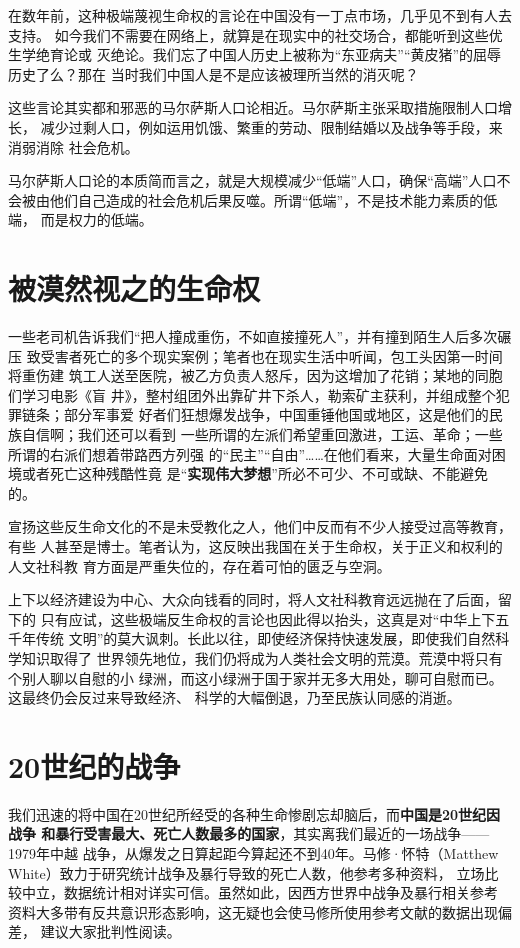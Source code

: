 在数年前，这种极端蔑视生命权的言论在中国没有一丁点市场，几乎见不到有人去支持。
如今我们不需要在网络上，就算是在现实中的社交场合，都能听到这些优生学绝育论或
灭绝论。我们忘了中国人历史上被称为“东亚病夫”“黄皮猪”的屈辱历史了么？那在
当时我们中国人是不是应该被理所当然的消灭呢？

这些言论其实都和邪恶的马尔萨斯人口论相近。马尔萨斯主张采取措施限制人口增长，
减少过剩人口，例如运用饥饿、繁重的劳动、限制结婚以及战争等手段，来消弱消除
社会危机。

马尔萨斯人口论的本质简而言之，就是大规模减少“低端”人口，确保“高端”人口不
会被由他们自己造成的社会危机后果反噬。所谓“低端”，不是技术能力素质的低端，
而是权力的低端。


\section{被漠然视之的生命权}

一些老司机告诉我们“把人撞成重伤，不如直接撞死人”，并有撞到陌生人后多次碾压
致受害者死亡的多个现实案例；笔者也在现实生活中听闻，包工头因第一时间将重伤建
筑工人送至医院，被乙方负责人怒斥，因为这增加了花销；某地的同胞们学习电影《盲
井》，整村组团外出靠矿井下杀人，勒索矿主获利，并组成整个犯罪链条；部分军事爱
好者们狂想爆发战争，中国重锤他国或地区，这是他们的民族自信啊；我们还可以看到
一些所谓的左派们希望重回激进，工运、革命；一些所谓的右派们想着带路西方列强
的“民主”“自由”……在他们看来，大量生命面对困境或者死亡这种残酷性竟
是“\textbf{实现伟大梦想}”所必不可少、不可或缺、不能避免的。

宣扬这些反生命文化的不是未受教化之人，他们中反而有不少人接受过高等教育，有些
人甚至是博士。笔者认为，这反映出我国在关于生命权，关于正义和权利的人文社科教
育方面是严重失位的，存在着可怕的匮乏与空洞。

上下以经济建设为中心、大众向钱看的同时，将人文社科教育远远抛在了后面，留下的
只有应试，这些极端反生命权的言论也因此得以抬头，这真是对“中华上下五千年传统
文明”的莫大讽刺。长此以往，即使经济保持快速发展，即使我们自然科学知识取得了
世界领先地位，我们仍将成为人类社会文明的荒漠。荒漠中将只有个别人聊以自慰的小
绿洲，而这小绿洲于国于家并无多大用处，聊可自慰而已。这最终仍会反过来导致经济、
科学的大幅倒退，乃至民族认同感的消逝。

\section{20世纪的战争}

我们迅速的将中国在20世纪所经受的各种生命惨剧忘却脑后，而\textbf{中国是20世纪因战争
  和暴行受害最大、死亡人数最多的国家}，其实离我们最近的一场战争——1979年中越
战争，从爆发之日算起距今算起还不到40年。马修·怀特（Matthew
White）\cite{mattwhite}致力于研究统计战争及暴行导致的死亡人数，他参考多种资料，
立场比较中立，数据统计相对详实可信。虽然如此，因西方世界中战争及暴行相关参考
资料大多带有反共意识形态影响，这无疑也会使马修所使用参考文献的数据出现偏差，
建议大家批判性阅读。

